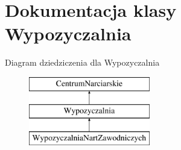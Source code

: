 \hypertarget{class_wypozyczalnia}{}\section{Dokumentacja klasy Wypozyczalnia}
\label{class_wypozyczalnia}
Diagram dziedziczenia dla Wypozyczalnia\begin{figure}[H]
\begin{center}
\leavevmode
\includegraphics[height=3.000000cm]{class_wypozyczalnia}
\end{center}
\end{figure}

